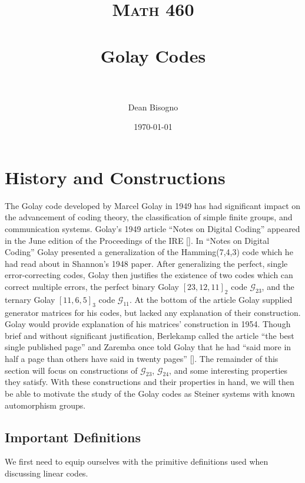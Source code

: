 \documentclass[paper=a4, fontsize=11pt]{scrartcl} %
\title{	
\normalfont \normalsize 
\textsc{Math 460} \\ [25pt] %
\horrule{0.5pt} \\[0.4cm] %
\huge Golay Codes\\ %
\horrule{2pt} \\[0.5cm] %
}
\author{Dean Bisogno} %
\date{\normalsize\today} %
\numberwithin{equation}{section} %
\numberwithin{figure}{section} %
\numberwithin{table}{section} %
\begin{document}
\maketitle %

\section{History and Constructions}

The Golay code developed by Marcel Golay in 1949 has had significant impact on the advancement of coding theory, the classification of simple finite groups, and communication systems. Golay's 1949 article ``Notes on Digital Coding'' appeared in the June edition of the Proceedings of the IRE [\cite{golay}]. In ``Notes on Digital Coding'' Golay presented a generalization of the Hamming(7,4,3) code which he had read about in Shannon's 1948 paper. After generalizing the perfect, single error-correcting codes, Golay then justifies the existence of two codes which can correct multiple errors, the perfect binary Golay $[23,12,11]_2$ code $\mathcal{G}_{23}$, and the ternary Golay $[11,6,5]_3$ code $\mathcal{G}_{11}$. At the bottom of the article Golay supplied generator matrices for his codes, but lacked any explanation of their construction. Golay would provide explanation of his matrices' construction in 1954. Though brief and without significant justification, Berlekamp called the article ``the best single published page'' and Zaremba once told Golay that he had ``said more in half a page than others have said in twenty pages'' [\cite{thompson}]. The remainder of this section will focus on constructions of $\mathcal{G}_{23}$, $\mathcal{G}_{24}$, and some interesting properties they satisfy. With these constructions and their properties in hand, we will then be able to motivate the study of the Golay codes as Steiner systems with known automorphism groups.

\subsection{Important Definitions}
We first need to equip ourselves with the primitive definitions used when discussing linear codes.
\end{document}
